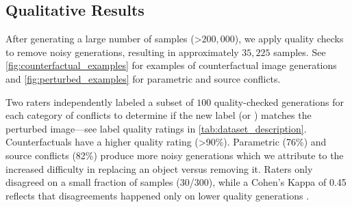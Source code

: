 \subsection{Qualitative Results}
After generating a large number of samples (\textgreater$200,000$), we apply quality checks to remove noisy generations, resulting in approximately $35,225$ samples. See \autoref{fig:counterfactual_examples}  for examples of counterfactual image generations and \autoref{fig:perturbed_examples} for parametric and source conflicts.

Two raters independently labeled a subset of $100$ quality-checked generations for each category of conflicts to determine if the new label (\retlabel or \updatedlabel) matches the perturbed image---see label quality ratings in \autoref{tab:dataset_description}. Counterfactuals have a higher quality rating (\textgreater90\%). Parametric (76\%) and source conflicts (82\%) produce more noisy generations which we attribute to the increased difficulty in replacing an object versus removing it. Raters only disagreed on a small fraction of samples (30/300), while a Cohen's Kappa of 0.45 reflects that disagreements happened only on lower quality generations \cite{delgado2019cohen}.



    


\vspace{-2mm}
